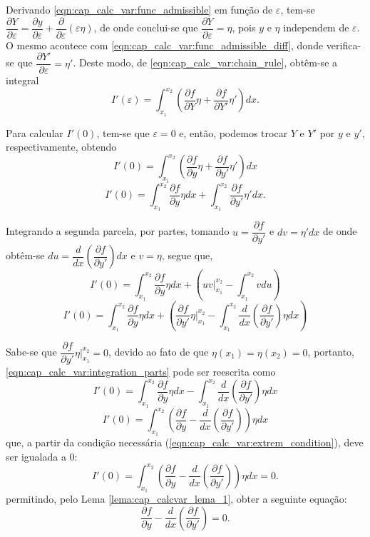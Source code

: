 \documentclass[
	12pt,				%
	openright,			%
    twoside,			%
	a4paper,			%
	english,			%
	french,				%
	spanish,			%
	brazil				%
	]{abntex2}
\numberwithin{lema}{chapter}
\numberwithin{teorema}{chapter}
\numberwithin{definicao}{chapter}
\numberwithin{exemplo}{chapter}
\numberwithin{figure}{chapter}
\begin{document}
Derivando \eqref{eqn:cap_calc_var:func_admissible} em função de $\varepsilon$, tem-se $\dfrac{\partial Y}{\partial \varepsilon}=\dfrac{\partial y}{\partial \varepsilon}+\dfrac{\partial}{\partial \varepsilon}(\varepsilon \eta)$, de onde conclui-se que $\dfrac{\partial Y}{\partial \varepsilon}=\eta$, pois $y$ e $\eta$ independem de $\varepsilon$. O mesmo acontece com \eqref{eqn:cap_calc_var:func_admissible_diff}, donde verifica-se que $\dfrac{\partial Y'}{\partial \varepsilon}=\eta'$. Deste modo, de \eqref{eqn:cap_calc_var:chain_rule}, obtêm-se a integral
$$I'(\varepsilon)=\int_{x_1}^{x_2}\left ( 
	\frac{\partial f}{\partial Y} \eta +
	\frac{\partial f}{\partial Y'} \eta '
\right )dx \text{.}
$$

Para calcular $I'(0)$, tem-se que $\varepsilon=0$ e, então, podemos trocar $Y$ e $Y'$ por $y$ e $y'$, respectivamente, obtendo
$$
I'(0)=\int_{x_1}^{x_2}\left (
	\frac{\partial f}{\partial y} \eta +
	\frac{\partial f}{\partial y'} \eta '
\right )dx
$$
$$
I'(0)=
	\int_{x_1}^{x_2} \frac{\partial f}{\partial y}\eta dx
	+
	\int_{x_1}^{x_2} \frac{\partial f}{\partial y'}\eta' dx \text{.}
$$

Integrando a segunda parcela, por partes, tomando $u=\dfrac{\partial f}{\partial y'}$ e $dv=\eta'dx$ de onde obtêm-se $du=\dfrac{d}{dx}\left ( \dfrac{\partial f}{\partial y'} \right )dx$ e $v=\eta$, segue que,
$$
I'(0)=
	\int_{x_1}^{x_2} \frac{\partial f}{\partial y}\eta dx
	+
	\left (
	uv \Big|_{x_1}^{x_2} - \int_{x_1}^{x_2}vdu
	\right )
$$
\begin{equation}\label{eqn:cap_calc_var:integration_parts}
I'(0)=
	\int_{x_1}^{x_2} \frac{\partial f}{\partial y}\eta dx
	+
	\left (
		\frac{\partial f}{\partial y'}\eta \Biggr|_{x_1}^{x_2} - \int_{x_1}^{x_2} \frac{d}{dx}\left ( \frac{\partial f}{\partial y'} \right ) \eta dx
	\right )
\end{equation}

Sabe-se que $\dfrac{\partial f}{\partial y'}\eta \Big |_{x_1}^{x_2}=0$, devido ao fato de que $\eta(x_1)=\eta(x_2)=0$, portanto, \eqref{eqn:cap_calc_var:integration_parts} pode ser reescrita como
\begin{equation}
	\label{eqn:cap_calc_var:func_admitindo_eta_0}
	I'(0)=
		\int_{x_1}^{x_2} \frac{\partial f}{\partial y}\eta dx
		-
		\int_{x_1}^{x_2} \frac{d}{dx} \left ( \frac{\partial f}{\partial y'} \right ) \eta dx
\end{equation}
$$
I'(0)=\int_{x_1}^{x_2}\left (
	\frac{\partial f}{\partial y} -
	\frac{d}{dx}
	\left (
		\frac{\partial f}{\partial y'}
	\right )
\right )\eta dx
$$
que, a partir da condição necessária (\ref{eqn:cap_calc_var:extrem_condition}), deve ser igualada a $0$:
$$
I'(0)=\int_{x_1}^{x_2}\left (
	\frac{\partial f}{\partial y} -
	\frac{d}{dx}
	\left (
		\frac{\partial f}{\partial y'}
	\right )
\right )\eta dx = 0	\text{.}
$$
permitindo, pelo Lema \ref{lema:cap_calcvar_lema_1}, obter a seguinte equação:
\begin{equation}\label{eqn:cap_calc_var:euler_lagrange}
\frac{\partial f}{\partial y} - \frac{d}{dx} \left ( \frac{\partial f}{\partial y'} \right )=0 \text{.}
\end{equation}
\end{document}
